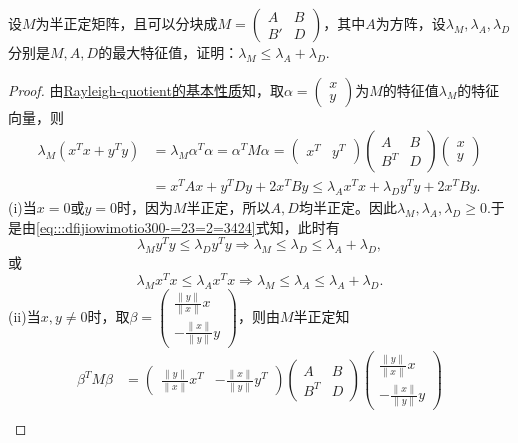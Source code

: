 \documentclass[../../main.tex]{subfiles}%
\begin{document}
\begin{example}
设$M$为半正定矩阵，且可以分块成$M=\begin{pmatrix} A & B \\ B' & D \end{pmatrix}$，其中$A$为方阵，设$\lambda_M,\lambda_A,\lambda_D$分别是$M,A,D$的最大特征值，证明：$\lambda_M \leqslant \lambda_A + \lambda_D$.
\end{example}
\begin{proof}

由\hyperref[proposition:Rayleigh-quotient瑞丽商的基本性质]{Rayleigh-quotient的基本性质}知，取$\alpha =\begin{pmatrix} x \\ y \end{pmatrix}$为$M$的特征值$\lambda_M$的特征向量，则
\begin{align}
\lambda_M (x^T x + y^T y) &= \lambda_M \alpha^T \alpha = \alpha^T M \alpha = \begin{pmatrix} x^T & y^T \end{pmatrix} \begin{pmatrix} A & B \\ B^T & D \end{pmatrix} \begin{pmatrix} x \\ y \end{pmatrix} \nonumber \\
&= x^T A x + y^T D y + 2x^T B y \leqslant \lambda_A x^T x + \lambda_D y^T y + 2x^T B y. \label{eq:::dfijiowimotio300-=23=2=3424}
\end{align}
(i)当$x=0$或$y=0$时，因为$M$半正定，所以$A,D$均半正定。因此$\lambda_M,\lambda_A,\lambda_D\geqslant 0$.于是由\eqref{eq:::dfijiowimotio300-=23=2=3424}式知，此时有
$$\lambda_M y^T y \leqslant \lambda_D y^T y \Longrightarrow \lambda_M \leqslant \lambda_D \leqslant \lambda_A + \lambda_D,$$
或
$$\lambda_M x^T x \leqslant \lambda_A x^T x \Longrightarrow \lambda_M \leqslant \lambda_A \leqslant \lambda_A + \lambda_D.$$
(ii)当$x,y \neq 0$时，取$\beta = \begin{pmatrix} \frac{\| y \|}{\| x \|}x \\ -\frac{\| x \|}{\| y \|}y \end{pmatrix}$，则由$M$半正定知
\begin{align*}
\beta^T M \beta &= \begin{pmatrix} \frac{\| y \|}{\| x \|}x^T & -\frac{\| x \|}{\| y \|}y^T \end{pmatrix} \begin{pmatrix} A & B \\ B^T & D \end{pmatrix} \begin{pmatrix} \frac{\| y \|}{\| x \|}x \\ -\frac{\| x \|}{\| y \|}y \end{pmatrix} \\

\end{align*}
\end{proof}
\end{document}
